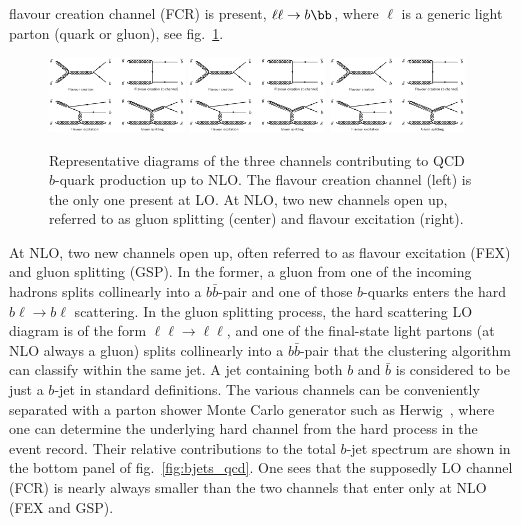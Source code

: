 flavour creation channel (FCR) is present, $\ell \ell \to b\bb$, where $\ell$
is a generic light parton (quark or gluon), see fig.~\ref{fig:qcd_diagrams}.
%
\begin{figure}[h!]
\centering
\includegraphics[width=0.32\textwidth,viewport=0 880 1500 1600,clip]{FIGS/bb_diagrams.jpg}
\includegraphics[width=0.32\textwidth,viewport=1600 0 3100 820,clip]{FIGS/bb_diagrams.jpg}
\includegraphics[width=0.32\textwidth,viewport=0 0 1500 820,clip]{FIGS/bb_diagrams.jpg}
\caption{Representative diagrams of the three channels contributing to QCD $b$-quark production up to NLO. The flavour creation channel (left) is the only one present at LO. At NLO, two new channels open up, referred to as gluon splitting (center) and  flavour excitation (right).}
\label{fig:qcd_diagrams}
\end{figure}
%
At NLO, two new channels open up, often referred to as flavour excitation (FEX) and gluon splitting (GSP). In the former, a gluon from one of the incoming hadrons splits collinearly into a $b \bar{b}$-pair and one of those $b$-quarks enters the hard $b\ell \to b\ell$ scattering. In the gluon splitting process, the hard scattering LO diagram is of the form $\ell \ell \to \ell \ell$, and one of the final-state light partons (at NLO always a gluon) splits collinearly into a $b \bar{b}$-pair that the clustering algorithm can classify within the same jet. A jet containing both $b$ and $ \bar{b}$ is considered to be just a $b$-jet in standard definitions.
The various channels can be conveniently separated with a parton shower Monte Carlo generator such as Herwig~\cite{Herwig}, where one can determine the underlying hard channel from the hard process in the event record. Their relative contributions to the total $b$-jet spectrum are shown in the bottom panel of fig.~\ref{fig:bjets_qcd}.  One sees that the supposedly LO channel (FCR) is nearly always smaller than the two channels that enter only at NLO (FEX and GSP). %

